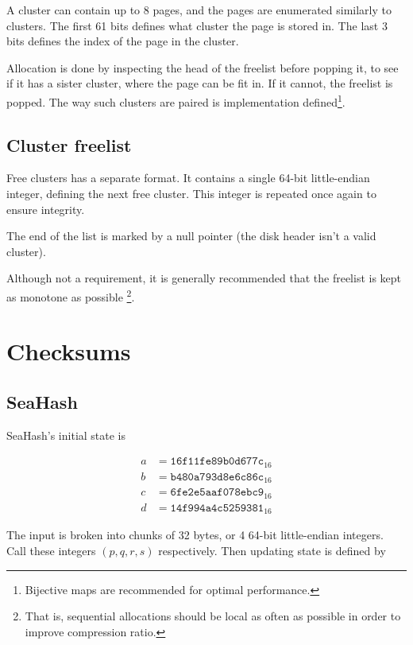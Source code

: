 \documentclass[11pt,a4paper]{report}
\begin{document}
        A cluster can contain up to 8 pages, and the pages are enumerated
        similarly to clusters. The first 61 bits defines what cluster the page
        is stored in. The last 3 bits defines the index of the page in the
        cluster.

        Allocation is done by inspecting the head of the freelist before
        popping it, to see if it has a sister cluster, where the page can be
        fit in. If it cannot, the freelist is popped. The way such clusters are
        paired is implementation defined\footnote{Bijective maps are
        recommended for optimal performance.}.

        \subsection{Cluster freelist}
        \label{cluster:freelist}
        Free clusters has a separate format. It contains a single 64-bit
        little-endian integer, defining the next free cluster. This integer is
        repeated once again to ensure integrity.

        The end of the list is marked by a null pointer (the disk header isn't
        a valid cluster).

        Although not a requirement, it is generally recommended that the
        freelist is kept as monotone as possible \footnote{That is,
        sequential allocations should be local as often as possible in order
        to improve compression ratio.}.

    \section{Checksums}
        \subsection{SeaHash}
        \label{checksum:seahash}
        SeaHash's initial state is

        \begin{align*}
            a &= \texttt{16f11fe89b0d677c}_{16} \\
            b &= \texttt{b480a793d8e6c86c}_{16} \\
            c &= \texttt{6fe2e5aaf078ebc9}_{16} \\
            d &= \texttt{14f994a4c5259381}_{16}
        \end{align*}

        The input is broken into chunks of 32 bytes, or 4 64-bit little-endian
        integers. Call these integers $(p, q, r, s)$ respectively. Then
        updating state is defined by
\end{document}
